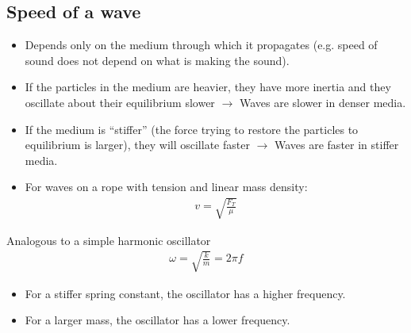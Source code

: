 \documentclass[aspectratio=169,
hyperref={colorlinks,urlcolor=blue}
]{beamer}
\begin{document}
\subsection{Speed of a wave}
\label{subsec:speedofawave}
{
\begin{itemize}
\item Depends only on the medium through which it propagates (e.g. speed of sound does not depend on what is making the sound).
\item If the particles in the medium are heavier, they have more inertia and they oscillate about their equilibrium slower $\rightarrow$ Waves are slower in denser media.
\item If the medium is ``stiffer'' (the force trying to restore the particles to equilibrium is larger), they will oscillate faster $\rightarrow$ Waves are faster in stiffer media.


\end{itemize}
}
{
\begin{itemize}
\item For waves on a rope with tension  and linear mass density:
\begin{align*}
v=\sqrt{\frac{F_T}{\mu}}
\end{align*}
\end{itemize}
\begin{block}{Analogous to a simple harmonic
oscillator}
\vspace{-0.25cm}
\begin{align*}
\omega =\sqrt{\frac{k}{m}}=2\pi f
\end{align*}
\vspace{-0.5cm}
\begin{itemize}
\item For a stiffer spring constant, the
oscillator has a higher frequency.
\item For a larger mass, the oscillator
has a lower frequency.
\end{itemize}

\end{block}
}



\end{document}
